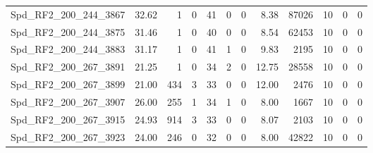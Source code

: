 \begin{longtable}[c]{@{}lrrrrrrrrrrr@{}}
Spd\_RF2\_200\_244\_3867     & 32.62                  & 1                       & 0                       & 41                     & 0                       & 0                       & 8.38                    & 87026                    & 10                       & 0                        & 0                        \\
Spd\_RF2\_200\_244\_3875     & 31.46                  & 1                       & 0                       & 40                     & 0                       & 0                       & 8.54                    & 62453                    & 10                       & 0                        & 0                        \\
Spd\_RF2\_200\_244\_3883     & 31.17                  & 1                       & 0                       & 41                     & 1                       & 0                       & 9.83                    & 2195                     & 10                       & 0                        & 0                        \\
Spd\_RF2\_200\_267\_3891     & 21.25                  & 1                       & 0                       & 34                     & 2                       & 0                       & 12.75                   & 28558                    & 10                       & 0                        & 0                        \\
Spd\_RF2\_200\_267\_3899     & 21.00                  & 434                     & 3                       & 33                     & 0                       & 0                       & 12.00                   & 2476                     & 10                       & 0                        & 0                        \\
Spd\_RF2\_200\_267\_3907     & 26.00                  & 255                     & 1                       & 34                     & 1                       & 0                       & 8.00                    & 1667                     & 10                       & 0                        & 0                        \\
Spd\_RF2\_200\_267\_3915     & 24.93                  & 914                     & 3                       & 33                     & 0                       & 0                       & 8.07                    & 2103                     & 10                       & 0                        & 0                        \\
Spd\_RF2\_200\_267\_3923     & 24.00                  & 246                     & 0                       & 32                     & 0                       & 0                       & 8.00                    & 42822                    & 10                       & 0                        & 0                        \\

\end{longtable}
